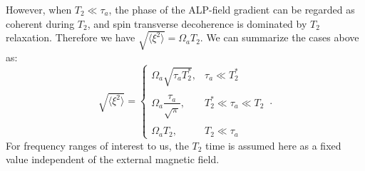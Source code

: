 However, when $T_2 \ll \tau_a$, the phase of the ALP-field gradient can be regarded as coherent during $T_2$, and spin transverse decoherence is dominated by $T_2$ relaxation. Therefore we have $\sqrt{\langle \xi^2\rangle}=\Omega_{a}T_2$. 
We can summarize the cases above as: 
\begin{equation}
    \sqrt{\langle \xi^2\rangle}  = \left\{
    \begin{array}{cl}
    \Omega_{a}\sqrt{\tau_a T_2^*} ,
    &  \tau_a \ll T_2^*\\
    & \\
    \Omega_a\dfrac{\tau_a}{\sqrt{\pi}} ,
    &  T_2^*\ll\tau_a \ll T_2\\
    & \\
    \Omega_a T_2 ,
    &  T_2 \ll \tau_a
    \end{array} \right.
    \,.\label{eq:rms_xi}
\end{equation}
For frequency ranges of interest to us, 
the $T_2$ time is assumed here as a fixed value independent of the external magnetic field. 

